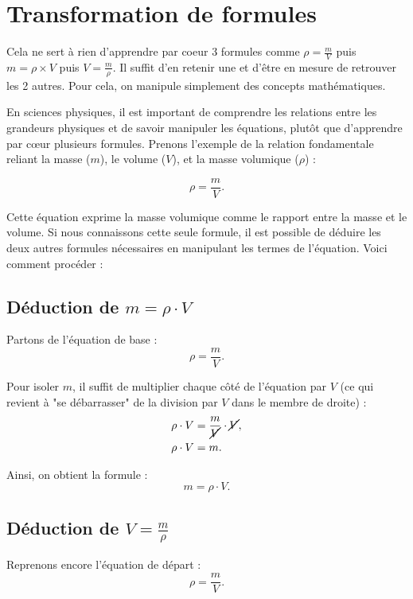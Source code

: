 \documentclass[a4paper,12pt]{article}
\begin{document}
\section{Transformation de formules}

\begin{tcolorbox}[colback=red!10!white, colframe=red!75!black, title=PAR COEUR]
  Cela ne sert à rien d'apprendre par coeur 3 formules comme $\rho = \frac{m}{V}$ puis $m = \rho \times V$ puis $V = \frac{m}{\rho}$. Il suffit d'en retenir une et d'être en mesure de retrouver les 2 autres. Pour cela, on manipule simplement des concepts mathématiques.
\end{tcolorbox}

En sciences physiques, il est important de comprendre les relations entre les grandeurs physiques et de savoir manipuler les équations, plutôt que d'apprendre par cœur plusieurs formules. Prenons l'exemple de la relation fondamentale reliant la masse ($m$), le volume ($V$), et la masse volumique ($\rho$) :

\begin{equation}
\rho = \frac{m}{V}.
\end{equation}

Cette équation exprime la masse volumique comme le rapport entre la masse et le volume. Si nous connaissons cette seule formule, il est possible de déduire les deux autres formules nécessaires en manipulant les termes de l'équation. Voici comment procéder :

\subsection*{Déduction de $m = \rho \cdot V$}
Partons de l'équation de base :
\begin{equation}
\rho = \frac{m}{V}.
\end{equation}

Pour isoler $m$, il suffit de multiplier chaque côté de l'équation par $V$ (ce qui revient à "se débarrasser" de la division par $V$ dans le membre de droite) :
\begin{align}
\rho \cdot V &= \frac{m}{\cancel{V}} \cdot \cancel{V}, \\
\rho \cdot V &= m.
\end{align}

Ainsi, on obtient la formule :
\begin{equation}
m = \rho \cdot V.
\end{equation}

\subsection*{Déduction de $V = \frac{m}{\rho}$}
Reprenons encore l'équation de départ :
\begin{equation}
\rho = \frac{m}{V}.
\end{equation}
\end{document}
